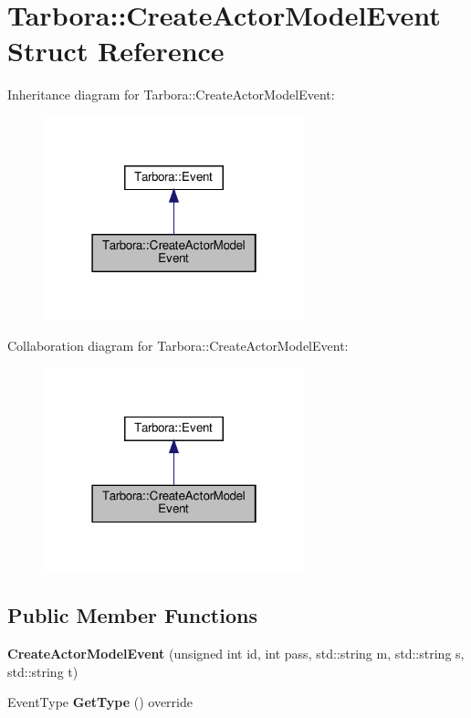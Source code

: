 \hypertarget{structTarbora_1_1CreateActorModelEvent}{}\section{Tarbora\+:\+:Create\+Actor\+Model\+Event Struct Reference}
\label{structTarbora_1_1CreateActorModelEvent}


Inheritance diagram for Tarbora\+:\+:Create\+Actor\+Model\+Event\+:\nopagebreak
\begin{figure}[H]
\begin{center}
\leavevmode
\includegraphics[width=214pt]{structTarbora_1_1CreateActorModelEvent__inherit__graph}
\end{center}
\end{figure}


Collaboration diagram for Tarbora\+:\+:Create\+Actor\+Model\+Event\+:\nopagebreak
\begin{figure}[H]
\begin{center}
\leavevmode
\includegraphics[width=214pt]{structTarbora_1_1CreateActorModelEvent__coll__graph}
\end{center}
\end{figure}
\subsection*{Public Member Functions}
\begin{DoxyCompactItemize}
\item 
\mbox{\label{structTarbora_1_1CreateActorModelEvent_ad46300e1d7b5a29b3b2c0567e9e14196}} 
{\bfseries Create\+Actor\+Model\+Event} (unsigned int id, int pass, std\+::string m, std\+::string s, std\+::string t)
\item 
\mbox{\label{structTarbora_1_1CreateActorModelEvent_a5efc84a26b8951c8123056ba8a74028e}} 
Event\+Type {\bfseries Get\+Type} () override
\end{DoxyCompactItemize}
